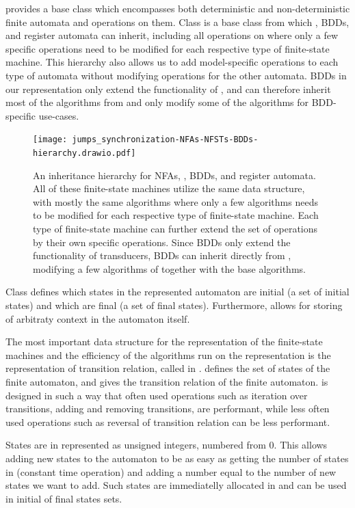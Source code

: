 \mata provides a base class \nfaClass which encompasses both deterministic and non-deterministic finite automata and operations on them.
Class \nfaClass is a base class from which \nfts, BDDs, and register automata can inherit, including all operations on \nfaClass where only a few specific operations need to be modified for each respective type of finite-state machine.
This hierarchy also allows us to add model-specific operations to each type of automata without modifying operations for the other automata.
BDDs in our representation only extend the functionality of \nfts, and can therefore inherit most of the algorithms from \nfts and only modify some of the algorithms for BDD-specific use-cases.

\begin{figure}[ht]
  \centering
  \texttt{[image: jumps\_synchronization-NFAs-NFSTs-BDDs-hierarchy.drawio.pdf]}
  \caption{
    An inheritance hierarchy for NFAs, \nfts, BDDs, and register automata.
    All of these finite-state machines utilize the same data structure, with mostly the same algorithms where only a few algorithms needs to be modified for each respective type of finite-state machine.
    Each type of finite-state machine can further extend the set of operations by their own specific operations.
    Since BDDs only extend the functionality of transducers, BDDs can inherit directly from \nfts, modifying a few algorithms of \nfts together with the base \nfaClass algorithms.
  }
\end{figure}

Class \nfaClass defines which states in the represented automaton are initial (a set of initial states) and which are final (a set of final states).
Furthermore, \nfaClass allows for storing of arbitraty context in the automaton itself.

The most important data structure for the representation of the finite-state machines and the efficiency of the algorithms run on the representation is the representation of transition relation, called \deltastruct in \mata.
\deltastruct defines the set of states of the finite automaton, and gives the transition relation of the finite automaton.
\deltastruct is designed in such a way that often used operations such as iteration over transitions, adding and removing transitions, are performant, while less often used operations such as reversal of transition relation can be less performant.

States are in \mata represented as unsigned integers, numbered from 0.
This allows adding new states to the automaton to be as easy as getting the number of states in \deltastruct (constant time operation) and adding a number equal to the number of new states we want to add.
Such states are immediatelly allocated in \deltastruct and can be used in initial of final states sets.

